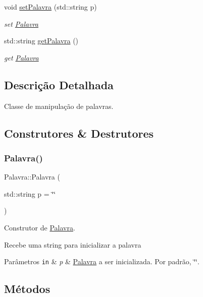 \begin{DoxyCompactItemize}
void \hyperlink{classPalavra_a77fbc808d5749f73a2974b7276a0d000}{set\+Palavra} (std\+::string p)
\begin{DoxyCompactList}\small\item\em set \hyperlink{classPalavra}{Palavra} \end{DoxyCompactList}\item 
std\+::string \hyperlink{classPalavra_a08bfe271e5e30c04f711fcf94609ab9a}{get\+Palavra} ()
\begin{DoxyCompactList}\small\item\em get \hyperlink{classPalavra}{Palavra} \end{DoxyCompactList}\end{DoxyCompactItemize}


\subsection{Descrição Detalhada}
Classe de manipulação de palavras. 

\subsection{Construtores \& Destrutores}
\mbox{\label{classPalavra_a81db9f79dee404bfd73fe9fc9f861be3}} 
\subsubsection{\texorpdfstring{Palavra()}{Palavra()}}
{\footnotesize\ttfamily Palavra\+::\+Palavra (\begin{DoxyParamCaption}\item[{std\+::string}]{p = {\ttfamily \char`\"{}\char`\"{}} }\end{DoxyParamCaption})}



Construtor de \hyperlink{classPalavra}{Palavra}. 

Recebe uma string para inicializar a palavra 
\begin{DoxyParams}[1]{Parâmetros}
\mbox{\tt in}  & {\em p} & \hyperlink{classPalavra}{Palavra} a ser inicializada. Por padrão, \char`\"{}\char`\"{}. \\
\hline
\end{DoxyParams}


\subsection{Métodos}
\mbox{\label{classPalavra_a08bfe271e5e30c04f711fcf94609ab9a}} 
